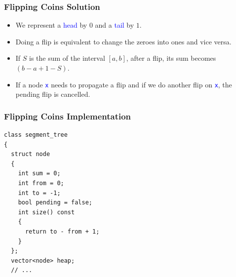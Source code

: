 \documentclass{beamer}
\newcommand{\uvalink}[2]{UVa Online Judge (http://uva.onlinejudge.org)
  problem number \href{#2}{\textcolor{blue}{#1}.}}
\newcommand{\cheflink}[2]{Code Chef (http://www.codechef.com)
  problem \href{#2}{\textcolor{blue}{#1}.}}
\newcounter{exo}
\newcommand{\exo}{
  \addtocounter{exo}{1}
  Exercice \arabic{exo}
}
\begin{document}

\ifanswers

\begin{frame}%
\frametitle{Flipping Coins Solution}

\begin{itemize}

\item We represent a \textcolor{blue}{head} by $0$ and a \textcolor{blue}{tail} by $1$.

\vspace{0.2cm}

\item<2-> Doing a flip is equivalent to change the zeroes into ones and vice versa.

\vspace{0.2cm}

\item<3-> If $S$ is the sum of the interval $[a, b]$, after a flip, its sum becomes $(b - a + 1 - S)$.

\vspace{0.2cm}

\item<4-> If a node \textcolor{blue}{\texttt{x}} needs to propagate a flip and if we do another flip on \textcolor{blue}{\texttt{x}}, the pending flip is cancelled.

\end{itemize}

\end{frame}


\begin{frame}[containsverbatim]
\frametitle{Flipping Coins Implementation}

\scriptsize

\begin{lstlisting}[mathescape]
class segment_tree
{
  struct node
  {
    int sum = 0;
    int from = 0;
    int to = -1;
    bool pending = false;
    int size() const
    {
      return to - from + 1;
    }
  };
  vector<node> heap;
  // ...
\end{lstlisting}

\end{frame}
\end{document}

